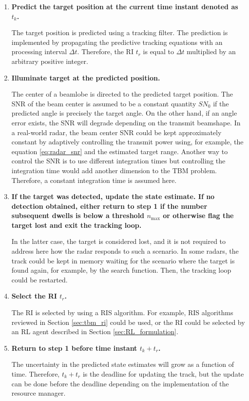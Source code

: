 \documentclass[english, 12pt, a4paper, elec, utf8, a-1b, online]{aaltothesis}
\numberwithin{equation}{section}
\newcommand{\nmax}{n_\text{max}}
\newcommand{\dt}{\Delta t}
\newcommand{\ri}{t_r}
\begin{document}
\begin{enumerate}
\item\textbf{Predict the target position at the current time instant denoted as $t_k$.}

The target position is predicted using a tracking filter. The prediction is implemented by propagating the predictive tracking equations with an processing interval $\dt$. 
Therefore, the RI $t_r$ is equal to $\dt$ multiplied by an arbitrary positive integer.

\item\textbf{Illuminate target at the predicted position.}

The center of a beamlobe is directed to the predicted target position. 
The SNR of the beam center is assumed to be a constant quantity $SN_0$ if the predicted angle is precisely the target angle. 
On the other hand, if an angle error exists, the SNR will degrade depending on the transmit beamshape. 
In a real-world radar, the beam center SNR could be kept approximately constant by adaptively controlling the transmit power using, for example, the equation \eqref{eq:radar_snr} and the estimated target range. 
Another way to control the SNR is to use different integration times but controlling the integration time would add another dimension to the TBM problem. 
Therefore, a constant integration time is assumed here.

\item\textbf{If the target was detected, update the state estimate. If no detection obtained, either return to step 1 if the number subsequent dwells is below a threshold $\nmax$ or otherwise flag the target lost and exit the tracking loop.}

In the latter case, the target is considered lost, and it is not required to address here how the radar responds to such a scenario. 
In some radars, the track could be kept in memory waiting for the scenario where the target is found again, for example, by the search function. 
Then, the tracking loop could be restarted.


\item\textbf{Select the RI $\ri$.}

The RI is selected by using a RIS algorithm.
For example, RIS algorithms reviewed in Section \ref{sec:tbm_ri} could be used, or the RI could be selected by an RL agent described in Section \ref{sec:RL_formulation}.

\item\textbf{Return to step 1 before time instant $t_k + \ri$.}

The uncertainty in the predicted state estimates will grow as a function of time. Therefore, $t_k + \ri$ is the deadline for updating the track, but the update can be done before the deadline depending on the implementation of the resource manager.

\end{enumerate}
\end{document}
